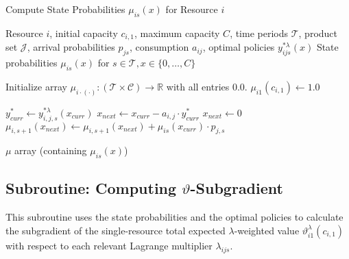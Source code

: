 \documentclass[11pt]{article}
\newcommand{\R}{\mathbb{R}}
\begin{document}
\begin{algorithm}[H]
\caption{Compute State Probabilities $\mu_{is}(x)$ for Resource $i$}
\label{alg:compute_mu}
\begin{algorithmic}[1]
\Require Resource $i$, initial capacity $c_{i,1}$, maximum capacity $C$, time periods $\mathcal{T}$, product set $\mathcal{J}$, arrival probabilities $p_{js}$, consumption $a_{ij}$, optimal policies $y^{*\lambda}_{ijs}(x)$
\Ensure State probabilities $\mu_{is}(x)$ for $s \in \mathcal{T}, x \in \{0, \ldots, C\}$

\State Initialize array $\mu_{i \cdot (\cdot)} : (\mathcal{T} \times \mathcal{C}) \to \R$ with all entries $0.0$.
\State $\mu_{i1}(c_{i,1}) \gets 1.0$ 

 
     
         
             
                \State $y^*_{curr} \gets y^{*\lambda}_{i,j,s}(x_{curr})$ 
                \State $x_{next} \gets x_{curr} - a_{i,j} \cdot y^*_{curr}$
                 
                    \State $x_{next} \gets 0$ 
                \EndIf
                \State $\mu_{i,s+1}(x_{next}) \gets \mu_{i,s+1}(x_{next}) + \mu_{is}(x_{curr}) \cdot p_{j,s}$
            \EndFor
        \EndIf
    \EndFor
\EndFor

\State \Return $\mu$ array (containing $\mu_{is}(x)$)
\end{algorithmic}
\end{algorithm}

\vspace{0.5cm}



\subsection{Subroutine: Computing $\vartheta$-Subgradient}

\noindent
This subroutine uses the state probabilities and the optimal policies to calculate the subgradient of the single-resource total expected $\lambda$-weighted value $\vartheta^\lambda_{i1}(c_{i,1})$ with respect to each relevant Lagrange multiplier $\lambda_{ijs}$.
\end{document}
